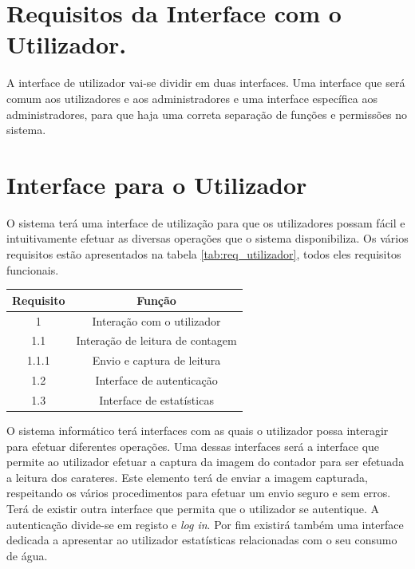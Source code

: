 \section{Requisitos da Interface com o Utilizador.} \label{sec:req_ut}
A interface de utilizador vai-se dividir em duas interfaces. Uma interface que será comum aos utilizadores e aos administradores e uma interface específica aos administradores, para que haja uma correta separação de funções e permissões no sistema. 

\section{Interface para o Utilizador} \label{sec:req_ut2}
O sistema terá uma interface de utilização para que os utilizadores possam fácil e intuitivamente efetuar as diversas operações que o sistema disponibiliza. Os vários requisitos estão apresentados na tabela \ref{tab:req_utilizador}, todos eles requisitos funcionais.

\begin{center}
\begin{tabular}[c]{||c  c ||}  %
\hline
Requisito & Função\\
\hline
1 & Interação com o utilizador\\ 

1.1 & Interação de leitura de contagem\\

1.1.1 & Envio e captura de leitura\\

1.2 & Interface de autenticação\\

1.3 & Interface de estatísticas\\
\hline
\end{tabular}
\label{tab:req_utilizador}
\end{center}
\vspace{8mm} %

O sistema informático terá interfaces com as quais o utilizador possa interagir para efetuar diferentes operações. Uma dessas interfaces será a interface que permite ao utilizador efetuar a captura da imagem do contador para ser efetuada a leitura dos carateres. Este elemento terá de enviar a imagem capturada, respeitando os vários procedimentos para efetuar um envio seguro e sem erros.\\
Terá de existir outra interface que permita que o utilizador se autentique. A autenticação divide-se em registo e {\textit{log in}}. Por fim existirá também uma interface dedicada a apresentar ao utilizador estatísticas relacionadas com o seu consumo de água.


